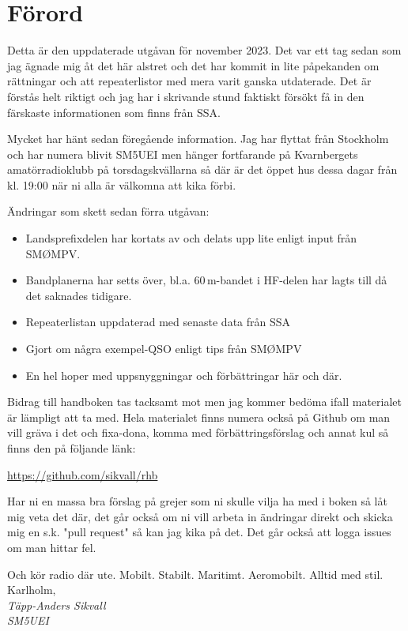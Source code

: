 

\section*{Förord}
	
Detta är den uppdaterade utgåvan för november 2023. Det var ett tag
sedan som jag ägnade mig åt det här alstret och det har kommit in lite
påpekanden om rättningar och att repeaterlistor med mera varit ganska
utdaterade. Det är förstås helt riktigt och jag har i skrivande stund
faktiskt försökt få in den färskaste informationen som finns från SSA.

Mycket har hänt sedan föregående information. Jag har flyttat från
Stockholm och har numera blivit SM5UEI men hänger fortfarande på
Kvarnbergets amatörradioklubb på torsdagskvällarna så där är det öppet
hus dessa dagar från kl. 19:00 när ni alla är välkomna att kika förbi.

Ändringar som skett sedan förra utgåvan:

\begin{itemize}[]
	\item Landsprefixdelen har kortats av och delats upp lite enligt 
	input från SMØMPV.
	\item Bandplanerna har setts över, bl.a. 60\,m-bandet i HF-delen 
	har lagts till då det saknades tidigare.
	\item Repeaterlistan uppdaterad med senaste data från SSA
	\item Gjort om några exempel-QSO enligt tips från SMØMPV
	\item En hel hoper med uppsnyggningar och förbättringar här och där.
\end{itemize}

Bidrag till handboken tas tacksamt mot men jag kommer bedöma ifall
materialet är lämpligt att ta med.  Hela materialet finns numera också
på Github om man vill gräva i det och fixa-dona, komma med 
förbättrings\-förslag och annat kul så finns den på följande länk:

\href{https://github.com/sikvall/rhb/}{https://github.com/sikvall/rhb}

Har ni en massa bra förslag på grejer som ni skulle vilja ha med i boken
så låt mig veta det där, det går också om ni vill arbeta in ändringar direkt
och skicka mig en s.k. "pull request" så kan jag kika på det. Det går också
att logga issues om man hittar fel.

Och kör radio där ute. Mobilt. Stabilt. Maritimt. Aeromobilt. Alltid med
stil.\\[4em]

Karlholm, \DokumentDatum\\
\textit{Täpp-Anders Sikvall\\
	SM5UEI}

\clearpage
	
